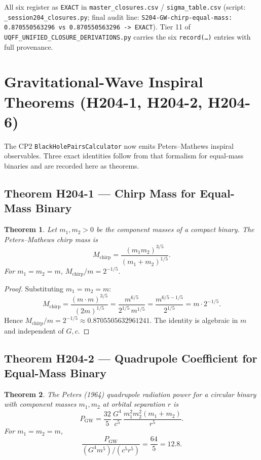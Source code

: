 \documentclass[11pt,letterpaper]{article}
\newtheorem{theorem}{Theorem}
\theoremstyle{definition}
\begin{document}
All six register as \texttt{EXACT} in \texttt{master\_closures.csv} /
\texttt{sigma\_table.csv} (script: \texttt{\_session204\_closures.py}; final
audit line: \texttt{S204-GW-chirp-equal-mass: 0.870550563296 vs 0.870550563296 -> EXACT}).
Tier 11 of \texttt{UQFF\_UNIFIED\_CLOSURE\_DERIVATIONS.py} carries the six
\texttt{record(\ldots)} entries with full provenance.

\section{Gravitational-Wave Inspiral Theorems (H204-1, H204-2, H204-6)}

The CP2 \texttt{BlackHolePairsCalculator} now emits Peters--Mathews
inspiral observables. Three exact identities follow from that formalism
for equal-mass binaries and are recorded here as theorems.

\subsection{Theorem H204-1 --- Chirp Mass for Equal-Mass Binary}

\begin{theorem}\label{thm:chirp}
Let $m_1, m_2 > 0$ be the component masses of a compact binary. The
Peters--Mathews chirp mass is
\[
   M_{\mathrm{chirp}}
   = \frac{(m_1 m_2)^{3/5}}{(m_1 + m_2)^{1/5}}.
\]
For $m_1 = m_2 = m$, $M_{\mathrm{chirp}}/m = 2^{-1/5}$.
\end{theorem}

\begin{proof}
Substituting $m_1 = m_2 = m$:
\[
   M_{\mathrm{chirp}}
   = \frac{(m \cdot m)^{3/5}}{(2m)^{1/5}}
   = \frac{m^{6/5}}{2^{1/5} \, m^{1/5}}
   = \frac{m^{6/5 - 1/5}}{2^{1/5}}
   = m \cdot 2^{-1/5}.
\]
Hence $M_{\mathrm{chirp}}/m = 2^{-1/5} \approx 0.8705505632961241$.
The identity is algebraic in $m$ and independent of $G, c$.
\end{proof}

\subsection{Theorem H204-2 --- Quadrupole Coefficient for Equal-Mass Binary}

\begin{theorem}\label{thm:quadrupole}
The Peters (1964) quadrupole radiation power for a circular binary with
component masses $m_1, m_2$ at orbital separation $r$ is
\[
   P_{\mathrm{GW}}
   = \frac{32}{5} \, \frac{G^4}{c^5} \,
     \frac{m_1^2 m_2^2 (m_1 + m_2)}{r^5}.
\]
For $m_1 = m_2 = m$,
\[
   \frac{P_{\mathrm{GW}}}{(G^4 m^5)/(c^5 r^5)}
   = \frac{64}{5} = 12.8.
\]
\end{theorem}
\end{document}
